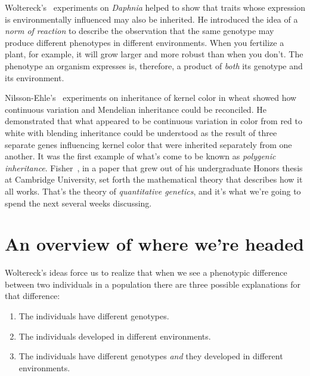 \documentclass[12pt]{article}
\begin{document}
Woltereck's~\cite{Woltereck-1909} experiments on {\it Daphnia\/}
helped to show that traits whose expression is environmentally
influenced may also be inherited. He introduced the idea of a {\it
  norm of reaction} to describe the observation that the same genotype
may produce different phenotypes in different environments. When you
fertilize a plant, for example, it will grow larger and more robust
than when you don't. The phenotype an organism expresses is,
therefore, a product of {\it both\/} its genotype and its
environment.

Nilsson-Ehle's~\cite{NilssonEhle-1909} experiments on inheritance of
kernel color in wheat showed how continuous variation and Mendelian
inheritance could be reconciled. He demonstrated that what appeared to
be continuous variation in color from red to white with blending
inheritance could be understood as the result of three separate genes
influencing kernel color that were inherited separately from one
another. It was the first example of what's come to be known as {\it
  polygenic inheritance}. Fisher~\cite{Fisher-1918}, in a paper that
grew out of his undergraduate Honors thesis at Cambridge University,
set forth the mathematical theory that describes how it all
works. That's the theory of {\it quantitative genetics}, and it's what
we're going to spend the next several weeks discussing.

\section*{An overview of where we're headed}

Woltereck's ideas force us to realize that when we see a phenotypic
difference between two individuals in a population there are three
possible explanations for that difference:

\begin{enumerate}

\item The individuals have different genotypes.

\item The individuals developed in different environments. 

\item The individuals have different genotypes {\it and\/} they
developed in different environments.

\end{enumerate}
\end{document}
